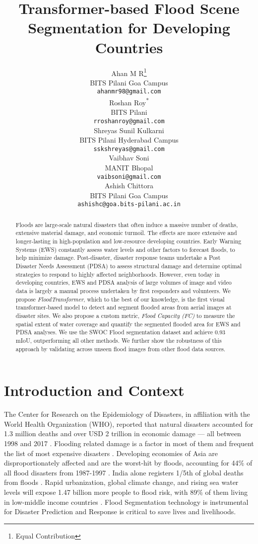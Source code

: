 \documentclass{article}
\title{Transformer-based Flood Scene Segmentation for Developing Countries}
\author{Ahan M R\thanks{Equal Contribution}\\
BITS Pilani Goa Campus \\
\texttt{ahanmr98@gmail.com} \\
  \And
  Roshan Roy\textsuperscript{*} \\
BITS Pilani\\
\texttt{rroshanroy@gmail.com} \\
\And
   Shreyas Sunil Kulkarni\\
BITS Pilani Hyderabad Campus \\
\texttt{sskshreyas@gmail.com} \\
    \And
   Vaibhav Soni \\
MANIT Bhopal \\
\texttt{vaibsoni@gmail.com} \\
  \And
   Ashish Chittora \\
BITS Pilani Goa Campus \\
\texttt{ashishc@goa.bits-pilani.ac.in}
}
\begin{document}
\maketitle

\begin{abstract}
Floods are large-scale natural disasters that often induce a massive number of deaths, extensive material damage, and economic turmoil. The effects are more extensive and longer-lasting in high-population and low-resource developing countries. Early Warning Systems (EWS) constantly assess water levels and other factors to forecast floods, to help minimize damage. Post-disaster, disaster response teams undertake a Post Disaster Needs Assessment (PDSA) to assess structural damage and determine optimal strategies to respond to highly affected neighborhoods. However, even today in developing countries, EWS and PDSA analysis of large volumes of image and video data is largely a manual process undertaken by first responders and volunteers. We propose \textit{FloodTransformer}, which to the best of our knowledge, is the first visual transformer-based model to detect and segment flooded areas from aerial images at disaster sites. We also propose a custom metric, \textit{Flood Capacity (FC)} to measure the spatial extent of water coverage and quantify the segmented flooded area for EWS and PDSA analyses. We use the SWOC Flood segmentation dataset and achieve 0.93 mIoU, outperforming all other methods. We further show the robustness of this approach by validating across unseen flood images from other flood data sources.
\end{abstract}

\section{Introduction and Context}
The Center for Research on the Epidemiology of Disasters, in affiliation with the World Health Organization (WHO), reported that natural disasters accounted for 1.3 million deaths and over USD 2 trillion in economic damage — all between 1998 and 2017 \cite{death-stats}. Flooding related damage is a factor in most of them \cite{flood-major} and frequent the list of most expensive disasters \cite{top-disaster-stats}. Developing economies of Asia are disproportionately affected and are the worst-hit by floods, accounting for 44\% of all flood disasters from 1987-1997 \cite{asia-stats}. India alone registers 1/5th of global deaths from floods \cite{india-stats}. 
Rapid urbanization, global climate change, and rising sea water levels will expose 1.47 billion more people to flood risk, with 89\% of them living in low-middle income countries \cite{projections}. Flood Segmentation technology is instrumental for Disaster Prediction and Response is critical to save lives and livelihoods. 
\end{document}
